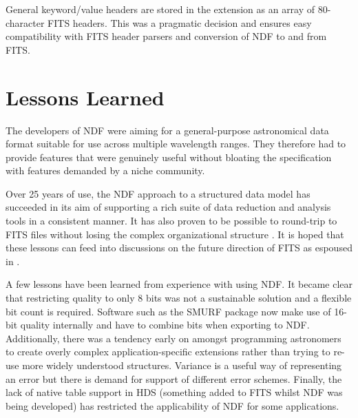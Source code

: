 \documentclass[11pt,twoside]{article}
\begin{document}
General keyword/value headers are stored in the extension as an array of
80-character FITS headers. This was a pragmatic decision and ensures
easy compatibility with FITS header parsers and conversion of NDF to
and from FITS.

\section{Lessons Learned}

The developers of NDF were aiming for a general-purpose astronomical
data format suitable for use across multiple wavelength ranges. They
therefore had to provide features that were genuinely useful without
bloating the specification with features demanded by a niche
community.

Over 25 years of use, the NDF approach to a structured data model has
succeeded in its aim of supporting a rich suite of data reduction and
analysis tools in a consistent manner. It has also proven to be
possible to round-trip to FITS files without losing the complex
organizational structure \citep[see e.g.][]{1997STARB..19...14C}. It
is hoped that these lessons can feed into discussions on the future
direction of FITS as espoused in \citet{P90_adassxxiii}.

A few lessons have been learned from experience with using NDF. It
became clear that restricting quality to only 8 bits was not a
sustainable solution and a flexible bit count is required. Software
such as the SMURF package \citep{2013MNRAS.430.2545C} now make use of
16-bit quality internally and have to combine bits when exporting to
NDF. Additionally, there was a tendency early on amongst programming
astronomers to create overly
complex application-specific extensions rather than trying to re-use
more widely understood structures. Variance is a useful way of
representing an error but there is demand for support of different
error schemes. Finally, the lack of native table support in HDS
(something added to FITS \citep{1988A&AS...73..365H} whilst NDF was
being developed) has restricted the applicability of NDF for some
applications.


\end{document}
